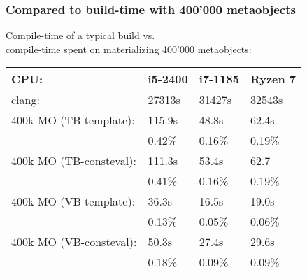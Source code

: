 \documentclass[compress,table,xcolor=table]{beamer}
\begin{document}
\begin{frame}
  \frametitle{Compared to build-time with 400'000 metaobjects}
  \large
  Compile-time of a typical  build vs.\\
  compile-time spent on materializing 400'000 metaobjects:
  \normalsize
  \begin{center}
  {
    \begin{tabular}{|p{4.5cm}|p{1.5cm}|p{1.5cm}|p{1.5cm}|}
    \hline
      CPU:    & i5-2400 & i7-1185 & Ryzen 7 \\
    \hline
      clang:                   & 27313s  & 31427s  & 32543s  \\
    \hline
      400k MO (TB-template):   & 115.9s  &  48.8s  &  62.4s  \\
                               & 0.42\%  & 0.16\%  &  0.19\% \\
    \hline
      400k MO (TB-consteval):  & 111.3s  &  53.4s  &  62.7   \\
                               & 0.41\%  & 0.16\%  &  0.19\% \\
    \hline
      400k MO (VB-template):   &  36.3s  &  16.5s  &  19.0s  \\
                               & 0.13\%  & 0.05\%  &  0.06\% \\
    \hline
      400k MO (VB-consteval):  &  50.3s  &  27.4s  &  29.6s  \\
                               & 0.18\%  & 0.09\%  &  0.09\% \\
    \hline
    \end{tabular}
  }
  \end{center}
\end{frame}
\end{document}
